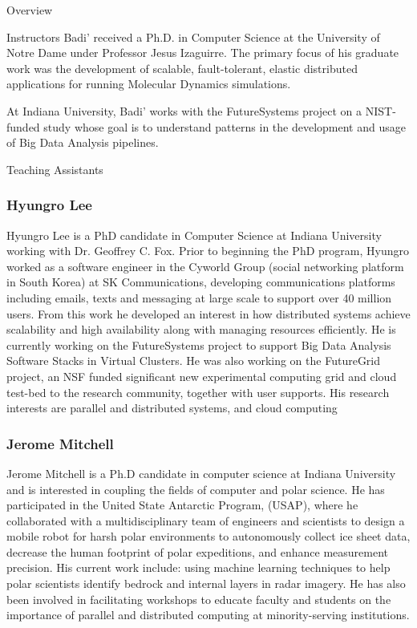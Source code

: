 \begin{edXchapter}{Overview}
\begin{edXsection}{Instructors}
Badi' received a Ph.D. in Computer Science at the University of Notre
Dame under Professor Jesus Izaguirre. The primary focus of his graduate
work was the development of scalable, fault-tolerant, elastic
distributed applications for running Molecular Dynamics simulations.

At Indiana University, Badi' works with the FutureSystems project on a
NIST-funded study whose goal is to understand patterns in the
development and usage of Big Data Analysis pipelines.

\end{edXsection}
\begin{edXsection}{Teaching Assistants}\label{teaching-assistants}

\subsubsection{Hyungro Lee}\label{hyungro-lee}


Hyungro Lee is a PhD candidate in Computer Science at Indiana University
working with Dr. Geoffrey C. Fox. Prior to beginning the PhD program,
Hyungro worked as a software engineer in the Cyworld Group (social
networking platform in South Korea) at SK Communications, developing
communications platforms including emails, texts and messaging at large
scale to support over 40 million users. From this work he developed an
interest in how distributed systems achieve scalability and high
availability along with managing resources efficiently. He is currently
working on the FutureSystems project to support Big Data Analysis
Software Stacks in Virtual Clusters. He was also working on the
FutureGrid project, an NSF funded significant new experimental computing
grid and cloud test-bed to the research community, together with user
supports. His research interests are parallel and distributed systems,
and cloud computing

\subsubsection{Jerome Mitchell}\label{jerome-mitchell}


Jerome Mitchell is a Ph.D candidate in computer science at Indiana
University and is interested in coupling the fields of computer and
polar science. He has participated in the United State Antarctic
Program, (USAP), where he collaborated with a multidisciplinary team of
engineers and scientists to design a mobile robot for harsh polar
environments to autonomously collect ice sheet data, decrease the human
footprint of polar expeditions, and enhance measurement precision. His
current work include: using machine learning techniques to help polar
scientists identify bedrock and internal layers in radar imagery. He has
also been involved in facilitating workshops to educate faculty and
students on the importance of parallel and distributed computing at
minority-serving institutions.


\end{edXsection}
\end{edXchapter}
